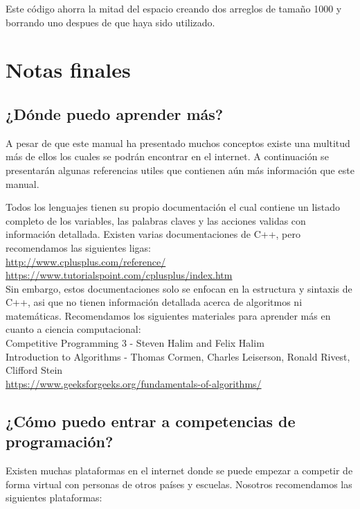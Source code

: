 \documentclass{article}
\begin{document}
Este código ahorra la mitad del espacio creando dos arreglos de tamaño 1000 y borrando uno despues de que haya sido utilizado.

\section{Notas finales}

\subsection{¿Dónde puedo aprender más?}

A pesar de que este manual ha presentado muchos conceptos existe una multitud más de ellos los cuales se podrán encontrar en el internet. A continuación se presentarán algunas referencias utiles que contienen aún más información que este manual.

Todos los lenguajes tienen su propio documentación el cual contiene un listado completo de los variables, las palabras claves y las acciones validas con información detallada. Existen varias documentaciones de C++, pero recomendamos las siguientes ligas: \\

\url{http://www.cplusplus.com/reference/} \\

\url{https://www.tutorialspoint.com/cplusplus/index.htm} \\

Sin embargo, estos documentaciones solo se enfocan en la estructura y sintaxis de C++, asi que no tienen información detallada acerca de algoritmos ni matemáticas. Recomendamos los siguientes materiales para aprender más en cuanto a ciencia computacional: \\

Competitive Programming 3 - Steven Halim and Felix Halim \\

Introduction to Algorithms - Thomas Cormen, Charles Leiserson, Ronald Rivest, Clifford Stein \\

\url{https://www.geeksforgeeks.org/fundamentals-of-algorithms/} \\

\subsection{¿Cómo puedo entrar a competencias de programación?}

Existen muchas plataformas en el internet donde se puede empezar a competir de forma virtual con personas de otros países y escuelas. Nosotros recomendamos las siguientes plataformas: \\
\end{document}
